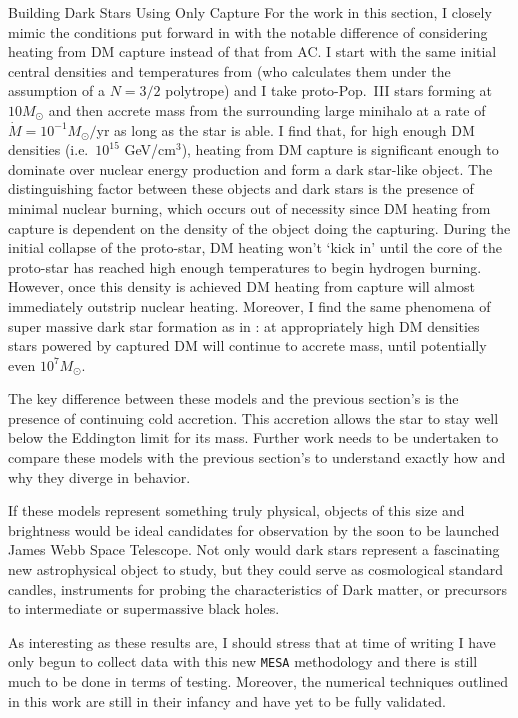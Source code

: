 \documentclass[a4paper,11pt]{article}
\begin{document}
\begin{section}{Building Dark Stars Using Only Capture}
    For the work in this section, I closely mimic the conditions put forward in \cite{Rindler-Daller:2015} with the notable difference of considering heating from DM capture instead of that from AC.
    I start with the same initial central densities and temperatures from \cite{Rindler-Daller:2020}(who calculates them under the assumption of a $N=3/2$ polytrope) and I take proto-Pop.~III stars forming at $10 M_{\odot}$ and then accrete mass from the surrounding large minihalo at a rate of $\dot{M} = 10^{-1} M_{\odot}/$yr as long as the star is able.
    I find that, for high enough DM densities (i.e.~$10^{15}$ GeV/cm$^3$), heating from DM capture is significant enough to dominate over nuclear energy production and form a dark star-like object.
    The distinguishing factor between these objects and dark stars is the presence of minimal nuclear burning, which occurs out of necessity since DM heating from capture is dependent on the density of the object doing the capturing.
    During the initial collapse of the proto-star, DM heating won't `kick in' until the core of the proto-star has reached high enough temperatures to begin hydrogen burning.
    However, once this density is achieved DM heating from capture will almost immediately outstrip nuclear heating.
    Moreover, I find the same phenomena of super massive dark star formation as in \cite{Rindler-Daller:2015}: at appropriately high DM densities stars powered by captured DM will continue to accrete mass, until potentially even $10^7 M_{\odot}$.

    The key difference between these models and the previous section's is the presence of continuing cold accretion.
    This accretion allows the star to stay well below the Eddington limit for its mass.
    Further work needs to be undertaken to compare these models with the previous section's to understand exactly how and why they diverge in behavior.

    If these models represent something truly physical, objects of this size and brightness would be ideal candidates for observation by the soon to be launched James Webb Space Telescope.
    Not only would dark stars represent a fascinating new astrophysical object to study, but they could serve as cosmological standard candles, instruments for probing the characteristics of Dark matter, or precursors to intermediate or supermassive black holes.

    As interesting as these results are, I should stress that at time of writing I have only begun to collect data with this new \texttt{MESA} methodology and there is still much to be done in terms of testing. 
    Moreover, the numerical techniques outlined in this work are still in their infancy and have yet to be fully validated.
\end{section}
\end{document}
